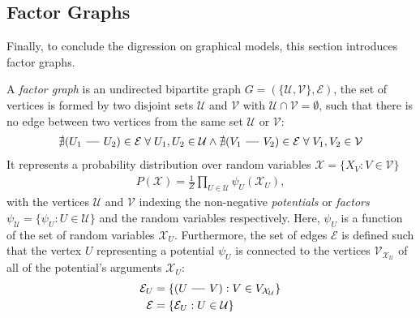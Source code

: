 \subsection{Factor Graphs}
\label{subsec:factor-graphs}
Finally, to conclude the digression on graphical models, this section introduces factor graphs.

\begin{mydef}
    \label{def:factor-graph}
    A \emph{factor graph} is an undirected bipartite graph $G=(\{\mathcal{U},\mathcal{V}\},
    \mathcal{E})$, \ie the set of vertices is formed by two disjoint sets $\mathcal{U}$ and
    $\mathcal{V}$ with $\mathcal{U} \cap \mathcal{V} = \emptyset$, such that there is no edge
    between two vertices from the same set $\mathcal{U}$ or $\mathcal{V}$:
\begin{align}
    \label{eq:bipartite}
    \nexists (U_1 \textbf{ --- } U_2) \in \mathcal{E} \; \forall \; U_1, U_2 \in
    \mathcal{U} \wedge \nexists (V_1 \textbf{ --- } V_2) \in \mathcal{E} \; \forall \; V_1, V_2 \in
    \mathcal{V}
\end{align}
It represents a probability distribution over random variables $\mathcal{X} = \{X_V : V \in \mathcal{V}\}$
\begin{align}
    \label{eq:fg-distribution}
    P(\mathcal{X}) = \frac{1}{Z}\prod_{U \in \mathcal{U}}\psi_U(\mathcal{X}_U),
\end{align}
with the vertices $\mathcal{U}$ and $\mathcal{V}$ indexing the non-negative \emph{potentials} or
\emph{factors} $\psi_\mathcal{U} = \{\psi_U : U \in \mathcal{U}\}$ and the random variables
respectively. Here, $\psi_U$ is a function of the set of random variables
$\mathcal{X}_U$. Furthermore, the set of edges $\mathcal{E}$ is defined such that the vertex $U$
representing a potential $\psi_U$ is connected to the vertices $\mathcal{V}_{\mathcal{X_U}}$ of all
of the potential's arguments $\mathcal{X}_U$:
\begin{align}
    \label{eq:fg-edges}
    \mathcal{E}_U &= \left\{(U \textbf{ --- } V ) : V \in {V}_{\mathcal{X_U}}\right\}\\
    \mathcal{E} &= \left\{\mathcal{E}_U : U \in \mathcal{U}\right\}
\end{align}
\end{mydef}

